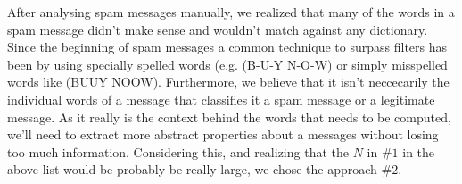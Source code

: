 After analysing spam messages manually, we realized that many of the
words in a spam message didn't make sense and wouldn't match against any
dictionary. Since the beginning of spam messages a common technique to surpass
filters has been by using specially spelled words (e.g. (B-U-Y N-O-W) or simply
misspelled words like (BUUY NOOW). \cite{machine-learning-methods-spam}
Furthermore, we believe that it isn't neccecarily the individual words of a
message that classifies it a spam message or a legitimate message. As it really
is the context behind the words that needs to be computed, we'll
need to extract more abstract properties about a messages without losing too
much information.
Considering this, and realizing that the $N$ in \#$1$ in the above
list would be probably be really large, we chose the approach \#$2$.

